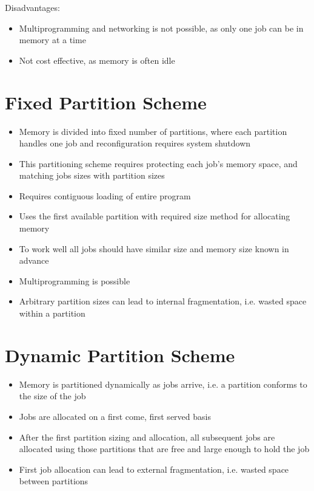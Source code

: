 \documentclass[12pt letter]{report}
\begin{document}
Disadvantages:
\begin{itemize}
  \item Multiprogramming and networking is not possible, as only one job can be in memory at a time
  \item Not cost effective, as memory is often idle
\end{itemize}

\section{Fixed Partition Scheme}

\begin{itemize}
  \item Memory is divided into fixed number of partitions, where each partition handles one job and reconfiguration requires system shutdown
  \item This partitioning scheme requires protecting each job's memory space, and matching jobs sizes with partition sizes
  \item Requires contiguous loading of entire program
  \item  Uses the first available partition with required size method for allocating memory
  \item To work well all jobs should have similar size and memory size known in advance
  \item Multiprogramming is possible
  \item Arbitrary partition sizes can lead to internal fragmentation, i.e. wasted space within a partition
\end{itemize}

\section{Dynamic Partition Scheme}

\begin{itemize}
  \item Memory is partitioned dynamically as jobs arrive, i.e. a partition conforms to the size of the job
  \item Jobs are allocated on a first come, first served basis
  \item After the first partition sizing and allocation, all subsequent jobs are allocated using those partitions that are free and large enough to hold the job
  \item First job allocation can lead to external fragmentation, i.e. wasted space between partitions
\end{itemize}
\end{document}
